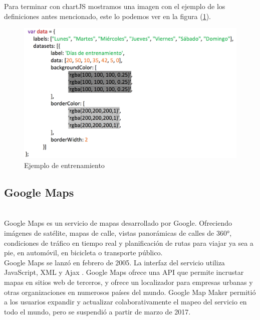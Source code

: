 \documentclass[a4paper, 11pt]{article}
\begin{document}
\begin{itemize}
          Para terminar con chartJS mostramos una imagen con el ejemplo de los
          definiciones antes mencionado, este lo podemos ver en la figura
          (\ref{f:ejemplo-entrenamiento}).\\

          \begin{figure}[H]
              \centering
              \includegraphics[width=\textwidth]{ejemplo-entrenamiento}
              \caption{Ejemplo de entrenamiento}
              \label{f:ejemplo-entrenamiento}
          \end{figure}

        \subsection{Google Maps}\\

          Google Maps es un servicio de mapas desarrollado por Google. Ofreciendo
          imágenes de satélite, mapas de calle, vistas panorámicas de calles de
          360​​°, condiciones de tráfico en tiempo real y planificación de rutas
          para viajar ya sea a pie, en automóvil, en bicicleta o transporte
          público.\\

          Google Maps se lanzó en febrero de 2005. La interfaz del servicio
          utiliza JavaScript, XML y Ajax . Google Maps ofrece una API que permite
          incrustar mapas en sitios web de terceros, y ofrece un localizador para
          empresas urbanas y otras organizaciones en numerosos países del mundo.
          Google Map Maker permitió a los usuarios expandir y actualizar
          colaborativamente el mapeo del servicio en todo el mundo, pero se
          suspendió a partir de marzo de 2017.\\


\end{itemize}
\end{document}
